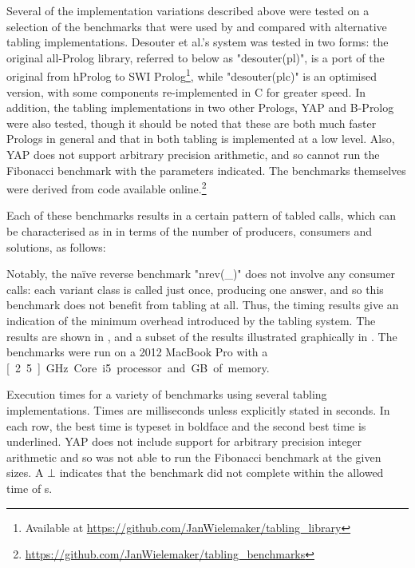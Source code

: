 Several of the implementation variations described above were tested on a selection
of the benchmarks that were used by \cite{DesouterVan-DoorenSchrijvers2015} and
compared with alternative tabling implementations. 
Desouter et al.'s system was tested in two forms: the original all-Prolog
library, referred to below as "desouter(pl)", is a port of the original from hProlog to SWI Prolog\footnote{%
Available at \url{https://github.com/JanWielemaker/tabling_library}}, while
"desouter(plc)" is an optimised version, with some components re-implemented
in C for greater speed. In addition, the tabling implementations in two other Prologs,
YAP and B-Prolog were also tested, though it should be noted that these are both
much faster Prologs in general and that in both tabling is implemented at a low level.
Also, YAP does not support arbitrary precision arithmetic, and so cannot run the Fibonacci benchmark
with the parameters indicated.
The benchmarks themselves were derived from code available online.\footnote{\url{https://github.com/JanWielemaker/tabling_benchmarks}}

Each of these benchmarks results in a certain pattern of tabled calls, which can be characterised
as in  in terms of the number of producers, consumers and solutions, as follows:
\begin{center}
  
\end{center}
Notably, the na\"ive reverse benchmark "nrev(_)" does not involve any consumer calls: each variant class
is called just once, producing one answer, and so this benchmark does not benefit from tabling at all.
Thus, the timing results give an indication of the minimum overhead introduced by the tabling system.
The results are shown in , and a subset of the results illustrated graphically in
. The benchmarks were run on a 2012 MacBook Pro with a \unit[2.5]{GHz} Core i5 processor and 
\unit[8]{GB} of memory.

\begin{table}
\small%
\begin{center}

\end{center}
\caption{Execution times for a variety of benchmarks using several tabling implementations.
Times are milliseconds unless explicitly stated in seconds. In each row, the best time
is typeset in boldface and the second best time is underlined. YAP does not include
support for arbitrary precision integer arithmetic and so was not able to run
the Fibonacci benchmark at the given sizes. A $\bot$ indicates that the benchmark
did not complete within the allowed time of \unit[240]{s}. }
\end{table}

